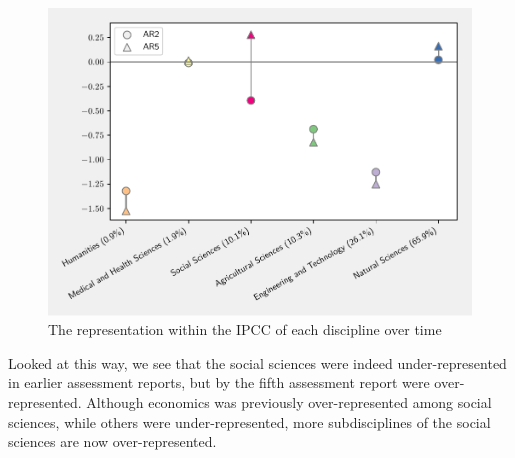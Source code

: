 \documentclass{article}
\begin{document}
\begin{linenumbers}
\begin{figure}
	\begin{center}
		\includegraphics[width=0.85\linewidth]{plots/ipcc_representation/ipcc_rep_oecds_simplified_short.pdf}
		\caption{The representation within the IPCC of each discipline over time}
		\label{oecd_rep}
	\end{center}
\end{figure}

Looked at this way, we see that the social sciences were indeed under-represented in earlier assessment reports, but by the fifth assessment report were over-represented. Although economics was previously over-represented among social sciences, while others were under-represented, more subdisciplines of the social sciences are now over-represented.





\end{linenumbers}
\end{document}
